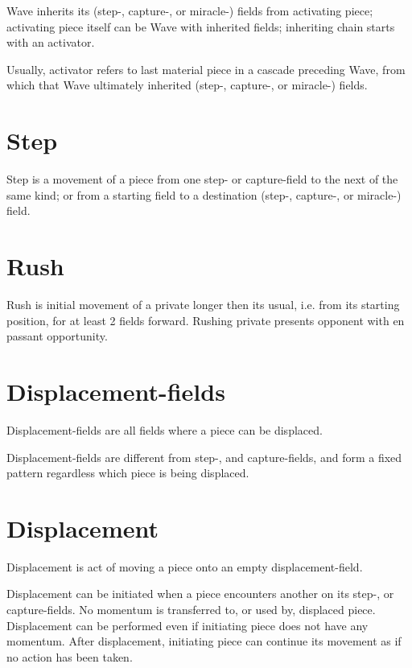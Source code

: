 Wave inherits its (step-, capture-, or miracle-) fields from activating piece;
activating piece itself can be Wave with inherited fields; inheriting chain
starts with an activator.

Usually, activator refers to last material piece in a cascade preceding Wave,
from which that Wave ultimately inherited (step-, capture-, or miracle-) fields.

\section*{Step}
\label{sec:Terms/Step}
Step is a movement of a piece from one step- or capture-field to the next of
the same kind; or from a starting field to a destination (step-, capture-, or
miracle-) field.

\section*{Rush}
\label{sec:Terms/Rush}
Rush is initial movement of a private longer then its usual, i.e. from its starting
position, for at least 2 fields forward. Rushing private presents opponent with en
passant opportunity.

\section*{Displacement-fields}
\label{sec:Terms/Displacement-fields}
Displacement-fields are all fields where a piece can be displaced.

Displacement-fields are different from step-, and capture-fields, and form a fixed
pattern regardless which piece is being displaced.

\section*{Displacement}
\label{sec:Terms/Displacement}
Displacement is act of moving a piece onto an empty displacement-field.

Displacement can be initiated when a piece encounters another on its step-,
or capture-fields. No momentum is transferred to, or used by, displaced piece.
Displacement can be performed even if initiating piece does not have any
momentum. After displacement, initiating piece can continue its movement
as if no action has been taken.

